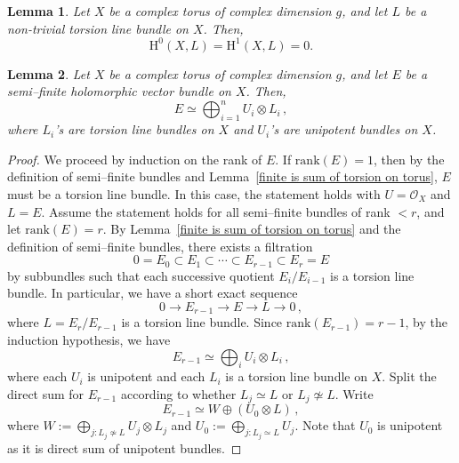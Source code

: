 \documentclass[10pt,a4paper]{amsart}
\newtheorem{lemma}{Lemma}
\begin{document}
\begin{lemma}\label{H^0=H^1=0}
	Let $X$ be a complex torus of complex dimension $g$, and let $L$ be a non-trivial torsion line bundle on $X$. Then, 
	$$\mathrm{H}^0(X,L)=\mathrm{H}^1(X,L)=0.$$
\end{lemma}

\begin{lemma}\label{sf=f+u}
	Let $X$ be a complex torus of complex dimension $g$, and let $E$ be a semi--finite holomorphic vector bundle on $X$. Then, 
	$$E\simeq \bigoplus_{i=1}^n U_i \otimes L_i\,, $$
	where $L_i$'s are torsion line bundles on $X$ and $U_i$'s are unipotent bundles on $X$.
\end{lemma}

\begin{proof}
	We proceed by induction on the rank of \(E\). If \(\mathrm{rank}(E)=1\), then by the definition of semi--finite bundles and Lemma~\ref{finite is sum of torsion on torus}, \(E\) must be a torsion line bundle. In this case, the statement holds with \(U=\mathcal{O}_X\) and \(L=E\). Assume the statement holds for all semi--finite bundles of rank \(< r\), and let \(\mathrm{rank}(E)=r\). By Lemma~\ref{finite is sum of torsion on torus} and the definition of semi--finite bundles, there exists a filtration
	\[
	0 = E_0 \subset E_1 \subset \cdots \subset E_{r-1} \subset E_r = E
	\]
	by subbundles such that each successive quotient \(E_i/E_{i-1}\) is a torsion line bundle. In particular, we have a short exact sequence
	\begin{equation}\label{eq:main-sequence}
		0 \longrightarrow E_{r-1} \longrightarrow E \longrightarrow L \longrightarrow 0 \,,
	\end{equation}
	where \(L = E_r/E_{r-1}\) is a torsion line bundle. Since \(\mathrm{rank}(E_{r-1})=r-1\), by the induction hypothesis, we have
	\[
	E_{r-1} \simeq \bigoplus_i U_i \otimes L_i \,,
	\]
	where each \(U_i\) is unipotent and each \(L_i\) is a torsion line bundle on \(X\). Split the direct sum for $E_{r-1}$ according to whether $L_j\simeq L$ or $L_j \not \simeq L$. Write
	$$E_{r-1} \simeq W \oplus (U_0 \otimes L) \,,$$
	where $W:= \bigoplus_{j:L_j \not \simeq L} U_j \otimes L_j$ and $U_0:= \bigoplus_{j:L_j \simeq L} U_j$. Note that $U_0$ is unipotent as it is direct sum of unipotent bundles.
	

\end{proof}
\end{document}

